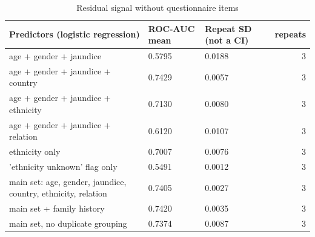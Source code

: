 \begin{table}
\caption{Residual signal without questionnaire items}
\label{tab:table7_residual_signal}
\begin{tabular}{lllr}
\toprule
Predictors (logistic regression) & ROC-AUC mean & Repeat SD (not a CI) & repeats \\
\midrule
age + gender + jaundice & 0.5795 & 0.0188 & 3 \\
age + gender + jaundice + country & 0.7429 & 0.0057 & 3 \\
age + gender + jaundice + ethnicity & 0.7130 & 0.0080 & 3 \\
age + gender + jaundice + relation & 0.6120 & 0.0107 & 3 \\
ethnicity only & 0.7007 & 0.0076 & 3 \\
'ethnicity unknown' flag only & 0.5491 & 0.0012 & 3 \\
main set: age, gender, jaundice, country, ethnicity, relation & 0.7405 & 0.0027 & 3 \\
main set + family history & 0.7420 & 0.0035 & 3 \\
main set, no duplicate grouping & 0.7374 & 0.0087 & 3 \\
\bottomrule
\end{tabular}
\end{table}
